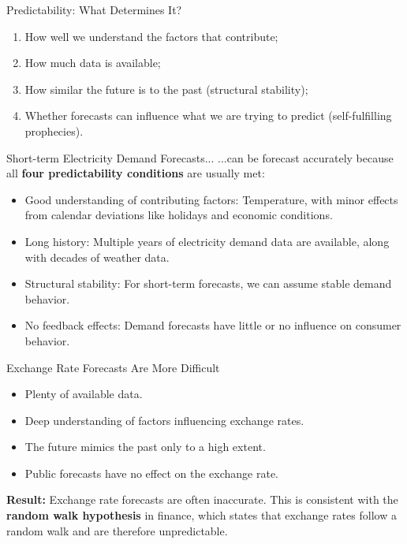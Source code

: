 \documentclass[11pt]{beamer}
\begin{document}
\begin{frame}[fragile]{Predictability: What Determines It?}
	\begin{enumerate}
		\setlength{\itemsep}{0.5cm}
		\item How well we understand the factors that contribute;
		\item How much data is available;
		\item How similar the future is to the past (structural stability);
		\item Whether forecasts can influence what we are trying to predict (self-fulfilling prophecies).
	\end{enumerate}
\end{frame}

\begin{frame}[fragile]{Short-term Electricity Demand Forecasts...}
	...can be forecast accurately because all \textbf{four predictability conditions} are usually met:
	\begin{itemize}
		\setlength{\itemsep}{0.2cm}
		\item[$\checkmark$] Good understanding of contributing factors: Temperature, with minor effects from calendar deviations like holidays and economic conditions.
		\item[$\checkmark$] Long history: Multiple years of electricity demand data are  available, along with decades of weather data.
		\item[$\checkmark$] Structural stability: For short-term forecasts, we can assume stable demand behavior.
		\item[$\checkmark$] No feedback effects: Demand forecasts have little or no influence on consumer behavior.
	\end{itemize}
\end{frame}

\begin{frame}[fragile]{Exchange Rate Forecasts Are More Difficult}
	\begin{itemize}
		\setlength{\itemsep}{0.2cm}
		\item[$\checkmark$] Plenty of available data.
		\item[$\times$] Deep understanding of factors influencing exchange rates.
		\item[$\times$] The future mimics the past only to a high extent.
		\item[$\times$] Public forecasts have no effect on the exchange rate.
	\end{itemize}
	\medskip

	\textbf{Result:} Exchange rate forecasts are often inaccurate. This is consistent with the \textbf{random walk hypothesis} in finance, which states that exchange rates follow a random walk and are therefore unpredictable.
\end{frame}
\end{document}
